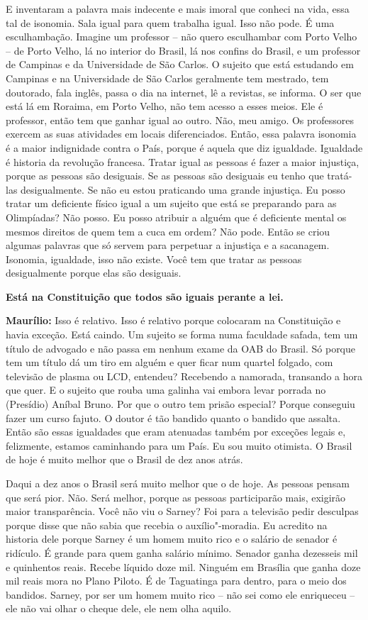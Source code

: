 E inventaram a palavra mais indecente e mais imoral que conheci na vida,
essa tal de isonomia. Sala igual para quem trabalha igual. Isso não
pode. É uma esculhambação. Imagine um professor -- não quero esculhambar
com Porto Velho -- de Porto Velho, lá no interior do Brasil, lá nos
confins do Brasil, e um professor de Campinas e da Universidade de São
Carlos. O sujeito que está estudando em Campinas e na Universidade de
São Carlos geralmente tem mestrado, tem doutorado, fala inglês, passa o
dia na internet, lê a revistas, se informa. O ser que está lá em
Roraima, em Porto Velho, não tem acesso a esses meios. Ele é professor,
então tem que ganhar igual ao outro. Não, meu amigo. Os professores
exercem as suas atividades em locais diferenciados. Então, essa palavra
isonomia é a maior indignidade contra o País, porque é aquela que diz
igualdade. Igualdade é historia da revolução francesa. Tratar igual as
pessoas é fazer a maior injustiça, porque as pessoas são desiguais. Se
as pessoas são desiguais eu tenho que tratá-las desigualmente. Se não eu
estou praticando uma grande injustiça. Eu posso tratar um deficiente
físico igual a um sujeito que está se preparando para as Olimpíadas? Não
posso. Eu posso atribuir a alguém que é deficiente mental os mesmos
direitos de quem tem a cuca em ordem? Não pode. Então se criou algumas
palavras que só servem para perpetuar a injustiça e a sacanagem.
Isonomia, igualdade, isso não existe. Você tem que tratar as pessoas
desigualmente porque elas são desiguais.

\textbf{Está na Constituição que todos são iguais perante a lei.}

\textbf{Maurílio:} Isso é relativo. Isso é relativo porque colocaram na
Constituição e havia exceção. Está caindo. Um sujeito se forma numa
faculdade safada, tem um título de advogado e não passa em nenhum exame
da OAB do Brasil. Só porque tem um título dá um tiro em alguém e quer
ficar num quartel folgado, com televisão de plasma ou LCD, entendeu?
Recebendo a namorada, transando a hora que quer. E o sujeito que rouba
uma galinha vai embora levar porrada no (Presídio) Aníbal Bruno. Por que
o outro tem prisão especial? Porque conseguiu fazer um curso fajuto. O
doutor é tão bandido quanto o bandido que assalta. Então são essas
igualdades que eram atenuadas também por exceções legais e, felizmente,
estamos caminhando para um País. Eu sou muito otimista. O Brasil de hoje
é muito melhor que o Brasil de dez anos atrás.

Daqui a dez anos o Brasil será muito melhor que o de hoje. As pessoas
pensam que será pior. Não. Será melhor, porque as pessoas participarão
mais, exigirão maior transparência. Você não viu o Sarney? Foi para a
televisão pedir desculpas porque disse que não sabia que recebia o
auxílio"-moradia. Eu acredito na historia dele porque Sarney é um homem
muito rico e o salário de senador é ridículo. É grande para quem ganha
salário mínimo. Senador ganha dezesseis mil e quinhentos reais. Recebe
líquido doze mil. Ninguém em Brasília que ganha doze mil reais mora no
Plano Piloto. É de Taguatinga para dentro, para o meio dos bandidos.
Sarney, por ser um homem muito rico -- não sei como ele enriqueceu --
ele não vai olhar o cheque dele, ele nem olha aquilo.

